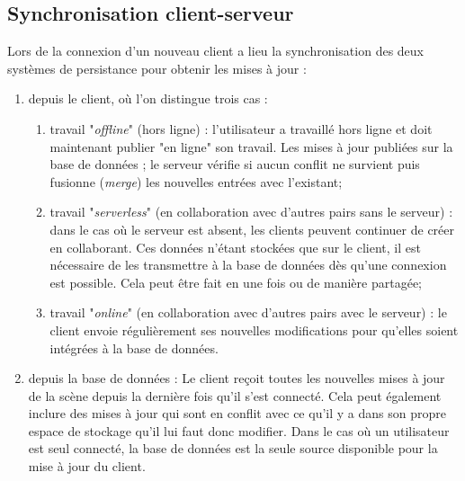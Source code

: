 \subsection{Synchronisation 
client-serveur}\label{sec:synchronisation-client-serveur}
Lors de la connexion d'un nouveau client a lieu la synchronisation des deux 
systèmes de persistance pour obtenir les mises à jour : 
\begin{enumerate}
	\item depuis le client, où l'on distingue trois cas :
	\begin{enumerate}
		\item travail "\textit{offline}" (hors ligne) : l'utilisateur a travaillé hors ligne et 
		doit maintenant publier "en ligne" son travail. Les mises à jour publiées sur la 
		base de données ; le serveur vérifie si aucun conflit ne survient puis 
		fusionne (\textit{merge}) les nouvelles entrées avec l'existant; 
		
		\item travail "\textit{serverless}" (en collaboration avec d'autres pairs sans le 
		serveur) : dans le cas où le serveur est absent, les clients peuvent continuer 
		de créer en collaborant. Ces données n'étant stockées que sur le client, il est 
		nécessaire de les transmettre à la base de données dès qu'une connexion est possible. 
		Cela peut être fait en une fois ou de manière partagée;
		
		\item travail "\textit{online}" (en collaboration avec d'autres pairs avec le 
		serveur) : le client envoie régulièrement  ses 
		nouvelles modifications pour qu'elles soient intégrées à la base de données.
	\end{enumerate}
	\item depuis la base de données :
	Le client reçoit toutes les nouvelles mises à jour de la scène depuis la dernière 
	fois qu'il s'est connecté. Cela peut également inclure des mises à jour qui sont 
	en conflit avec ce qu'il y a dans son propre espace de stockage qu'il lui faut 
	donc modifier.
	Dans le cas où un utilisateur est seul connecté, la base de données est la 
	seule source disponible pour la mise à jour du client. 
\end{enumerate}


